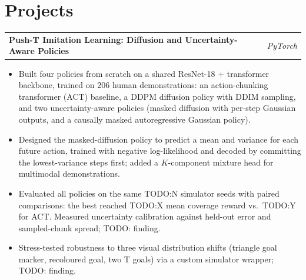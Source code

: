 \documentclass[letterpaper,11pt]{article}
\begin{document}
\section{Projects}

\begin{tabularx}{\linewidth}{ @{}X r@{} }
\textbf{Push-T Imitation Learning: Diffusion and Uncertainty-Aware Policies} %
 & \textit{\small PyTorch} \\
\end{tabularx}
\vspace{-1.2em}
\begin{itemize}
    \item[--] Built four policies from scratch on a shared ResNet-18 + transformer backbone, trained on 206 human demonstrations: an action-chunking transformer (ACT) baseline, a DDPM diffusion policy with DDIM sampling, and two uncertainty-aware policies (masked diffusion with per-step Gaussian outputs, and a causally masked autoregressive Gaussian policy).\vspace{-0.5em}
    \item[--] Designed the masked-diffusion policy to predict a mean and variance for each future action, trained with negative log-likelihood and decoded by committing the lowest-variance steps first; added a $K$-component mixture head for multimodal demonstrations.\vspace{-0.5em}
    \item[--] Evaluated all policies on the same TODO:N simulator seeds with paired comparisons: the best reached TODO:X mean coverage reward vs.\ TODO:Y for ACT. Measured uncertainty calibration against held-out error and sampled-chunk spread; TODO: finding.\vspace{-0.5em}
    \item[--] Stress-tested robustness to three visual distribution shifts (triangle goal marker, recoloured goal, two T goals) via a custom simulator wrapper; TODO: finding.
\end{itemize}
\vspace{-0.2em}
\end{document}
